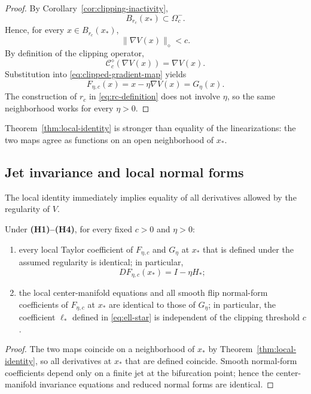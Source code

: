 \begin{proof}
By Corollary~\ref{cor:clipping-inactivity},
\[
B_{r_c}(x_*)
\subset\Omega_c^-.
\]
Hence, for every $x\in B_{r_c}(x_*)$,
\[
\|\nabla V(x)\|_\diamond<c.
\]
By definition of the clipping operator,
\[
\mathcal C_c^\diamond(\nabla V(x))
=
\nabla V(x).
\]
Substitution into \eqref{eq:clipped-gradient-map} yields
\[
F_{\eta,c}(x)
=
x-\eta\nabla V(x)
=
G_\eta(x).
\]
The construction of $r_c$ in \eqref{eq:rc-definition} does not
involve $\eta$, so the same neighborhood works for every $\eta>0$.
\end{proof}

Theorem~\ref{thm:local-identity} is stronger than equality of the
linearizations: the two maps agree as functions on an open
neighborhood of $x_*$.

\subsection{Jet invariance and local normal forms}
\label{subsec:jet-invariance}

The local identity immediately implies equality of all derivatives
allowed by the regularity of $V$.

\begin{corollary}
\label{cor:jet-invariance}
\label{cor:flip-coefficient-independence}
Under \textbf{(H1)--(H4)}, for every fixed $c>0$ and $\eta>0$:
\begin{enumerate}[label=\textnormal{(\roman*)}]
\item
every local Taylor coefficient of $F_{\eta,c}$ and $G_\eta$ at
$x_*$ that is defined under the assumed regularity is identical;
in particular,
\begin{equation}
DF_{\eta,c}(x_*)
=
I-\eta H_*;
\label{eq:clipped-linearization}
\end{equation}
\item
the local center-manifold equations and all smooth flip
normal-form coefficients of $F_{\eta,c}$ at $x_*$ are identical to
those of $G_\eta$; in particular, the coefficient $\ell_*$
defined in \eqref{eq:ell-star} is independent of the clipping
threshold $c$.
\end{enumerate}
\end{corollary}

\begin{proof}
The two maps coincide on a neighborhood of $x_*$ by
Theorem~\ref{thm:local-identity}, so all derivatives at $x_*$ that
are defined coincide.  Smooth normal-form coefficients depend only
on a finite jet at the bifurcation point; hence the center-manifold
invariance equations and reduced normal forms are identical.
\end{proof}

